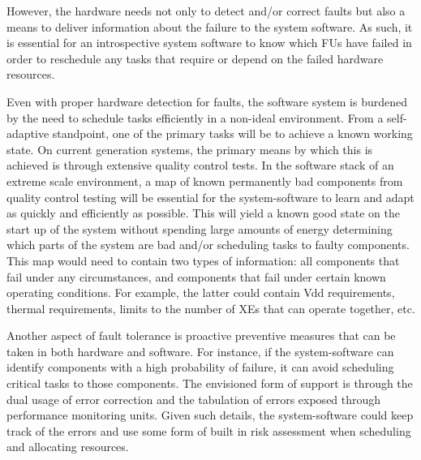     However, the hardware needs not only to detect and/or correct faults but also a means to deliver information about the failure to the system software. As such, it is essential for an introspective system software to know which FUs have failed in order to reschedule any tasks that require or depend on the failed hardware resources.

    Even with proper hardware detection for faults, the software system is burdened by the need to schedule tasks efficiently in a non-ideal environment. From a self-adaptive standpoint, one of the primary tasks will be to achieve a known working state. On current generation systems, the primary means by which this is achieved is through extensive quality control tests. In the software stack of an extreme scale environment, a map of known permanently bad components from quality control testing will be essential for the system-software to learn and adapt as quickly and efficiently as possible. This will yield a known good state on the start up of the system without spending large amounts of energy determining which parts of the system are bad and/or scheduling tasks to faulty components. This map would need to contain two types of information: all components that fail under any circumstances, and components that fail under certain known operating conditions. For example, the latter could contain Vdd requirements, thermal requirements, limits to the number of XEs that can operate together, etc.


    Another aspect of fault tolerance is proactive preventive measures that can be taken in both hardware and software. For instance, if the system-software can identify components with a high probability of failure, it can avoid scheduling critical tasks to those components. The envisioned form of support is through the dual usage of error correction and the tabulation of errors exposed through performance monitoring units. Given such details, the system-software could keep track of the errors and use some form of built in risk assessment when scheduling and allocating resources.

